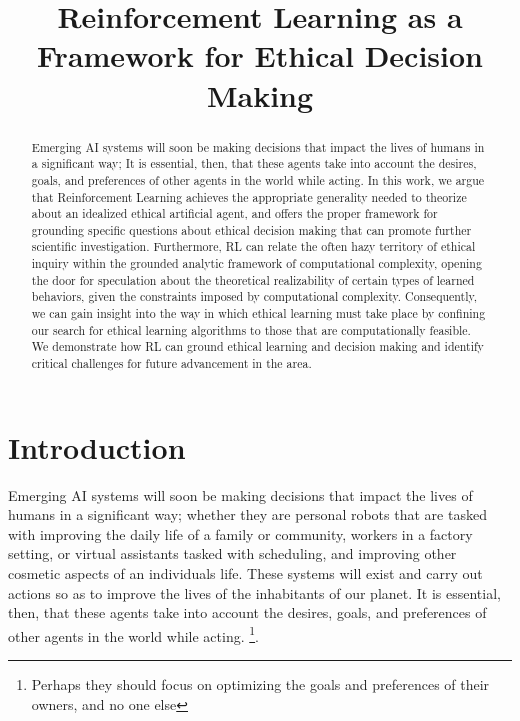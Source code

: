 \documentclass[11pt]{article}
\title{Reinforcement Learning as a Framework for Ethical Decision Making}
\author{}
\date{}                                           %
\begin{document}
\maketitle

\begin{abstract}
Emerging AI systems will soon be making decisions that impact the lives of humans in a significant way; It is essential, then, that these agents take into account the desires, goals, and preferences of other agents in the world while acting.
In this work, we argue that Reinforcement Learning achieves the appropriate generality needed to theorize about an idealized ethical artificial agent, and offers the proper framework for grounding specific questions about ethical decision making that can promote further scientific investigation.
Furthermore, RL can relate the often hazy territory of ethical inquiry within the grounded analytic framework of computational complexity, opening the door for speculation about the theoretical realizability of certain types of learned behaviors, given the constraints imposed by computational complexity. Consequently, we can gain insight into the way in which ethical learning must take place by confining our search for ethical learning algorithms to those that are computationally feasible. 
We demonstrate how RL can ground ethical learning and decision making and identify critical challenges for future advancement in the area.
\end{abstract}

\section{Introduction}

Emerging AI systems will soon be making decisions that impact the lives of humans in a significant way; whether they are personal robots that are tasked with improving the daily life of a family or community,  workers in a factory setting, or virtual assistants tasked with scheduling, and improving other cosmetic aspects of an individuals life.
These systems will exist and carry out actions so as to improve the lives of the inhabitants of our planet.
It is essential, then, that these agents take into account the desires, goals, and preferences of other agents in the world while acting. \footnote{Perhaps they should focus on optimizing the goals and preferences of their owners, and no one else}.
\end{document}
